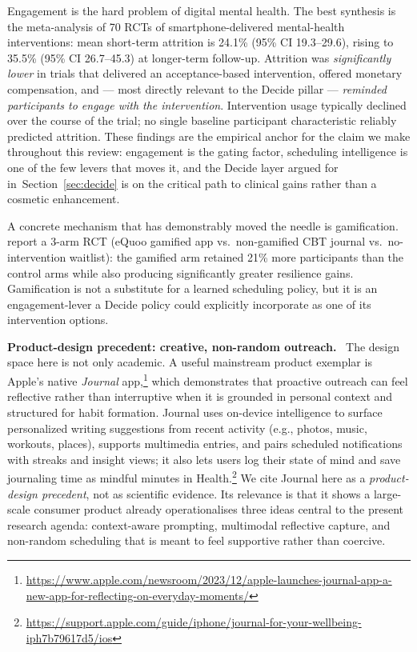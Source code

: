 \documentclass[10pt,conference]{article}
\newcommand{\secref}[1]{Section~\ref{#1}}
\renewcommand{\paragraph}[1]{\smallskip\par\noindent\textbf{#1}~\ignorespaces}
\begin{document}
Engagement is the hard problem of digital mental health. The best
synthesis is the \cite{Linardon2020Attrition} meta-analysis of 70 RCTs
of smartphone-delivered mental-health interventions: mean short-term
attrition is 24.1\% (95\% CI 19.3--29.6), rising to 35.5\% (95\% CI
26.7--45.3) at longer-term follow-up. Attrition was \emph{significantly
lower} in trials that delivered an acceptance-based intervention,
offered monetary compensation, and --- most directly relevant to the
Decide pillar --- \emph{reminded participants to engage with the
intervention}. Intervention usage typically declined over the course
of the trial; no single baseline participant characteristic reliably
predicted attrition. These findings are the empirical anchor for the
claim we make throughout this review: engagement is the gating factor,
scheduling intelligence is one of the few levers that moves it, and
the Decide layer argued for in~\secref{sec:decide} is on the critical
path to clinical gains rather than a cosmetic enhancement.

A concrete mechanism that has demonstrably moved the needle is
gamification. \cite{Litvin2020Gamification} report a 3-arm RCT
(eQuoo gamified app vs.\ non-gamified CBT journal vs.\ no-intervention
waitlist): the gamified arm retained 21\% more participants than the
control arms while also producing significantly greater resilience
gains. Gamification is not a substitute for a learned scheduling
policy, but it is an engagement-lever a Decide policy could
explicitly incorporate as one of its intervention options.

\paragraph{Product-design precedent: creative, non-random outreach.}
The design space here is not only academic. A useful mainstream
product exemplar is Apple's native \emph{Journal} app,\footnote{\url{https://www.apple.com/newsroom/2023/12/apple-launches-journal-app-a-new-app-for-reflecting-on-everyday-moments/}} which
demonstrates that proactive outreach can feel reflective rather than
interruptive when it is grounded in personal context and structured for
habit formation. Journal uses on-device intelligence to surface
personalized writing suggestions from recent activity (e.g., photos,
music, workouts, places), supports multimedia entries, and pairs
scheduled notifications with streaks and insight views; it also lets
users log their state of mind and save journaling time as mindful
minutes in Health.\footnote{\url{https://support.apple.com/guide/iphone/journal-for-your-wellbeing-iph7b79617d5/ios}}
We cite Journal here as a \emph{product-design precedent}, not as
scientific evidence. Its relevance is that it shows a large-scale
consumer product already operationalises three ideas central to the
present research agenda: context-aware prompting, multimodal reflective
capture, and non-random scheduling that is meant to feel supportive
rather than coercive.
\end{document}
